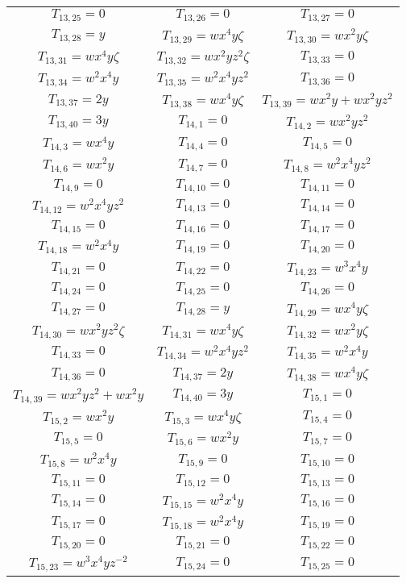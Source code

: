 \begin{longtable}{|c|c|c|}
$T_{13,25}= 0$&
$T_{13,26}= 0$&
$T_{13,27}= 0$\\
$T_{13,28}= y$&
$T_{13,29}= wx^4y\zeta$&
$T_{13,30}= wx^2y\zeta$\\
$T_{13,31}= wx^4y\zeta$&
$T_{13,32}= wx^2yz^2\zeta$&
$T_{13,33}= 0$\\
$T_{13,34}= w^2x^4y$&
$T_{13,35}= w^2x^4yz^2$&
$T_{13,36}= 0$\\
$T_{13,37}= 2y$&
$T_{13,38}= wx^4y\zeta$&
$T_{13,39}= wx^2y+wx^2yz^2$\\
$T_{13,40}= 3y$&
$T_{14,1}= 0$&
$T_{14,2}= wx^2yz^2$\\
$T_{14,3}= wx^4y$&
$T_{14,4}= 0$&
$T_{14,5}= 0$\\
$T_{14,6}= wx^2y$&
$T_{14,7}= 0$&
$T_{14,8}= w^2x^4yz^2$\\
$T_{14,9}= 0$&
$T_{14,10}= 0$&
$T_{14,11}= 0$\\
$T_{14,12}= w^2x^4yz^2$&
$T_{14,13}= 0$&
$T_{14,14}= 0$\\
$T_{14,15}= 0$&
$T_{14,16}= 0$&
$T_{14,17}= 0$\\
$T_{14,18}= w^2x^4y$&
$T_{14,19}= 0$&
$T_{14,20}= 0$\\
$T_{14,21}= 0$&
$T_{14,22}= 0$&
$T_{14,23}= w^3x^4y$\\
$T_{14,24}= 0$&
$T_{14,25}= 0$&
$T_{14,26}= 0$\\
$T_{14,27}= 0$&
$T_{14,28}= y$&
$T_{14,29}= wx^4y\zeta$\\
$T_{14,30}= wx^2yz^2\zeta$&
$T_{14,31}= wx^4y\zeta$&
$T_{14,32}= wx^2y\zeta$\\
$T_{14,33}= 0$&
$T_{14,34}= w^2x^4yz^2$&
$T_{14,35}= w^2x^4y$\\
$T_{14,36}= 0$&
$T_{14,37}= 2y$&
$T_{14,38}= wx^4y\zeta$\\
$T_{14,39}= wx^2yz^2+wx^2y$&
$T_{14,40}= 3y$&
$T_{15,1}= 0$\\
$T_{15,2}= wx^2y$&
$T_{15,3}= wx^4y\zeta$&
$T_{15,4}= 0$\\
$T_{15,5}= 0$&
$T_{15,6}= wx^2y$&
$T_{15,7}= 0$\\
$T_{15,8}= w^2x^4y$&
$T_{15,9}= 0$&
$T_{15,10}= 0$\\
$T_{15,11}= 0$&
$T_{15,12}= 0$&
$T_{15,13}= 0$\\
$T_{15,14}= 0$&
$T_{15,15}= w^2x^4y$&
$T_{15,16}= 0$\\
$T_{15,17}= 0$&
$T_{15,18}= w^2x^4y$&
$T_{15,19}= 0$\\
$T_{15,20}= 0$&
$T_{15,21}= 0$&
$T_{15,22}= 0$\\
$T_{15,23}= w^3x^4yz^{-2}$&
$T_{15,24}= 0$&
$T_{15,25}= 0$\\

\end{longtable}
